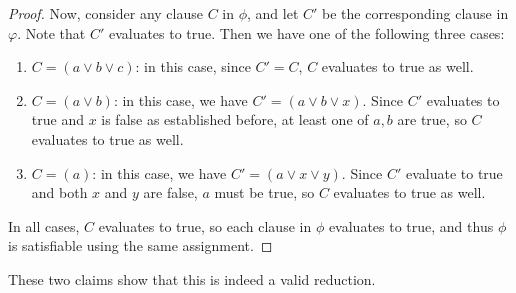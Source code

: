 \begin{soln}
\begin{proof}
        Now, consider any clause $C$ in $\phi$, and let $C'$ be the corresponding clause in $\varphi$. Note that $C'$ evaluates to true.
        Then we have one of the following
        three cases:
        \begin{enumerate}
            \item $C = (a \lor b \lor c)$: in this case, since $C' = C$, $C$ evaluates to true as well.
            \item $C = (a \lor b)$: in this case, we have $C' = (a \lor b \lor x)$. Since $C'$ evaluates to true and $x$ is false as established before, at least one of $a, b$ are true, so $C$ evaluates to true as well.
            \item $C = (a)$: in this case, we have $C' = (a \lor x \lor y)$. Since $C'$ evaluate to true and both $x$ and $y$ are false, $a$ must be true, so $C$ evaluates to true as well.
        \end{enumerate}
        In all cases, $C$ evaluates to true, so each clause in $\phi$ evaluates to true, and thus $\phi$ is satisfiable using the same assignment.
    \end{proof}
    These two claims show that this is indeed a valid reduction.
\end{soln}
